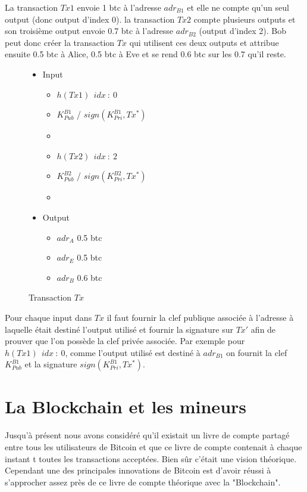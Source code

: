 \documentclass[11pt,a4paper]{article}
\begin{document}
La transaction $Tx1$ envoie 1 btc à l'adresse $adr_{B1}$ et elle ne compte qu'un seul output (donc output d'index 0). la transaction $Tx2$ compte plusieurs outputs et son troisième output envoie 0.7 btc à l'adresse $adr_{B2}$ (output d'index 2). Bob peut donc créer la transaction $Tx$ qui utilisent ces deux outputs et attribue ensuite 0.5 btc à Alice, 0.5 btc à Eve et se rend 0.6 btc sur les 0.7 qu'il reste.

\begin{figure}[H]
\begin{itemize}
\renewcommand{\labelitemi}{$\bullet$}
\renewcommand{\labelitemii}{$\star$}

\item Input
\begin{itemize}
\item $h(Tx1)~~idx~:~0$
\item $K_{Pub}^{B1}$ / $sign(K_{Pri}^{B1}, Tx^*)$
\item[ ]
\item $h(Tx2)~~idx~:~2$
\item $K_{Pub}^{B2}$ / $sign(K_{Pri}^{B2}, Tx^*)$
\item[ ]
\end{itemize}

\item Output
\begin{itemize}
\item $adr_A$ 0.5 btc
\item $adr_E$ 0.5 btc
\item $adr_B$ 0.6 btc
\end{itemize}

\end{itemize}

\caption{Transaction $Tx$}
\end{figure}


Pour chaque input dans $Tx$ il faut fournir la clef publique associée à l'adresse à laquelle était destiné l'output utilisé et fournir la signature sur $Tx'$ afin de prouver que l'on possède la clef privée associée. Par exemple pour $h(Tx1)~~idx~:~0$, comme l'output utilisé est destiné à $adr_{B1}$ on fournit la clef $K_{Pub}^{B1}$ et la signature $sign(K_{Pri}^{B1}, Tx^*)$.


\section{La Blockchain et les mineurs}

Jusqu'à présent nous avons considéré qu'il existait un livre de compte partagé entre tous les utilisateurs de Bitcoin et que ce livre de compte contenait à chaque instant t toutes les transactions acceptées. Bien sûr c'était une vision théorique. Cependant une des principales innovations de Bitcoin est d'avoir réussi à s'approcher assez près de ce livre de compte théorique avec la "Blockchain". 
\end{document}
